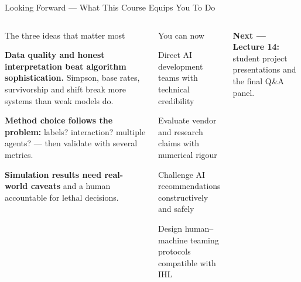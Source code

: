 \documentclass[aspectratio=169,10pt,t]{beamer}
\begin{document}
\begin{frame}{Looking Forward --- What This Course Equips You To Do}
\begin{columns}[T]
\begin{cbox}[AccentCol]{The three ideas that matter most}\scriptsize\begin{te}\item \textbf{Data quality and honest interpretation beat algorithm sophistication.} Simpson, base rates, survivorship and shift break more systems than weak models do.\item \textbf{Method choice follows the problem:} labels? interaction? multiple agents? --- then validate with several metrics.\item \textbf{Simulation results need real-world caveats} and a human accountable for lethal decisions.\end{te}\end{cbox}
\begin{cbox}[ISSAnavy]{You can now}\scriptsize\begin{tl}\item Direct AI development teams with technical credibility\item Evaluate vendor and research claims with numerical rigour\item Challenge AI recommendations constructively and safely\item Design human--machine teaming protocols compatible with IHL\end{tl}\end{cbox}
\begin{rbox}\scriptsize\textbf{Next --- Lecture 14:} student project presentations and the final Q\&A panel.\end{rbox}
\end{columns}
\end{frame}
\end{document}
